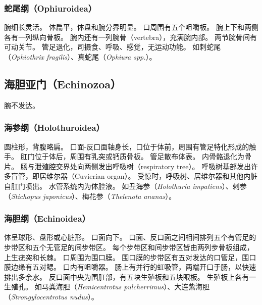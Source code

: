 \documentclass[11pt]{article}
\begin{document}
\subsubsection{蛇尾纲（Ophiuroidea）}
腕细长灵活。
体扁平，体盘和腕分界明显。
口周围有五个咀嚼板。
腕上下和两侧各有一列纵向骨板。
腕内还有一列腕骨（vertebra），充满腕内部。
两节腕骨间有可动关节。
管足退化，司摄食、呼吸、感觉，无运动功能。
如刺蛇尾（\textit{Ophiothrix fragilis}）、真蛇尾（\textit{Ophiura spp.}）。
  
\subsection{海胆亚门（Echinozoa）}
腕不发达。

\subsubsection{海参纲（Holothuroidea）}
圆柱形，背腹略扁。
口面-反口面轴身长，口位于体前，周围有管足特化形成的触手。
肛门位于体后，周围有乳突或钙质骨板。
管足散布体表。
内骨骼退化为骨片。
肠与泄殖腔交界处向两侧发出呼吸树（respiratory tree）。
呼吸树基部发出许多盲管，即居维尔器（Cuvierian organ）。
受惊时，呼吸树、居维尔器和其他内脏自肛门喷出。
水管系统内为体腔液。
如丑海参（\textit{Holothuria impatiens}）、刺参（\textit{Stichopus japonicus}）、梅花参（\textit{Thelenota ananas}）。

\subsubsection{海胆纲（Echinoidea）}
体呈球形、盘形或心脏形。
口面向下。
口面、反口面之间相间排列五个有管足的步带区和五个无管足的间步带区。
每个步带区和间步带区皆由两列步骨板组成，上生疣突和长棘。
口周围为围口膜。
围口膜的步带区有五对发达的口管足，围口膜边缘有五对鳃。
口内有咀嚼器。
肠上有并行的虹吸管，两端开口于肠，以快速排出多余水。
反口面中央为围肛部，有五块生殖板和五块眼板。
生殖板上各有一生殖孔。
如马粪海胆（\textit{Hemicentrotus pulcherrimus}）、大连紫海胆（\textit{Strongylocentrotus nudus}）。
\end{document}
